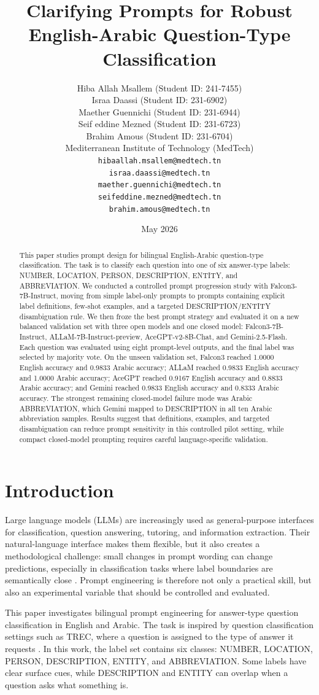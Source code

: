 \documentclass[10pt,twocolumn]{article}
\title{Clarifying Prompts for Robust English-Arabic Question-Type Classification}
\author{\begin{tabular}{c}
Hiba Allah Msallem (Student ID: 241-7455) \\
Israa Daassi (Student ID: 231-6902) \\
Maether Guennichi (Student ID: 231-6944) \\
Seif eddine Mezned (Student ID: 231-6723) \\
Brahim Amous (Student ID: 231-6704) \\[2pt]
Mediterranean Institute of Technology (MedTech) \\[2pt]
\scriptsize\texttt{hibaallah.msallem@medtech.tn} \\
\scriptsize\texttt{israa.daassi@medtech.tn} \\
\scriptsize\texttt{maether.guennichi@medtech.tn} \\
\scriptsize\texttt{seifeddine.mezned@medtech.tn} \\
\scriptsize\texttt{brahim.amous@medtech.tn}
\end{tabular}}
\date{May 2026}
\begin{document}
\maketitle
\begin{abstract}
This paper studies prompt design for bilingual English-Arabic question-type classification. The task is to classify each question into one of six answer-type labels: NUMBER, LOCATION, PERSON, DESCRIPTION, ENTITY, and ABBREVIATION. We conducted a controlled prompt progression study with Falcon3-7B-Instruct, moving from simple label-only prompts to prompts containing explicit label definitions, few-shot examples, and a targeted DESCRIPTION/ENTITY disambiguation rule. We then froze the best prompt strategy and evaluated it on a new balanced validation set with three open models and one closed model: Falcon3-7B-Instruct, ALLaM-7B-Instruct-preview, AceGPT-v2-8B-Chat, and Gemini-2.5-Flash. Each question was evaluated using eight prompt-level outputs, and the final label was selected by majority vote. On the unseen validation set, Falcon3 reached 1.0000 English accuracy and 0.9833 Arabic accuracy; ALLaM reached 0.9833 English accuracy and 1.0000 Arabic accuracy; AceGPT reached 0.9167 English accuracy and 0.8833 Arabic accuracy; and Gemini reached 0.9833 English accuracy and 0.8333 Arabic accuracy. The strongest remaining closed-model failure mode was Arabic ABBREVIATION, which Gemini mapped to DESCRIPTION in all ten Arabic abbreviation samples. Results suggest that definitions, examples, and targeted disambiguation can reduce prompt sensitivity in this controlled pilot setting, while compact closed-model prompting requires careful language-specific validation.
\end{abstract}
\section{Introduction}
Large language models (LLMs) are increasingly used as general-purpose interfaces for classification, question answering, tutoring, and information extraction. Their natural-language interface makes them flexible, but it also creates a methodological challenge: small changes in prompt wording can change predictions, especially in classification tasks where label boundaries are semantically close \cite{zhao2021calibrate,sclar2024quantifying,errica2025wrong}. Prompt engineering is therefore not only a practical skill, but also an experimental variable that should be controlled and evaluated.

This paper investigates bilingual prompt engineering for answer-type question classification in English and Arabic. The task is inspired by question classification settings such as TREC, where a question is assigned to the type of answer it requests \cite{voorhees2000building,li2002learning}. In this work, the label set contains six classes: NUMBER, LOCATION, PERSON, DESCRIPTION, ENTITY, and ABBREVIATION. Some labels have clear surface cues, while DESCRIPTION and ENTITY can overlap when a question asks what something is.
\end{document}
